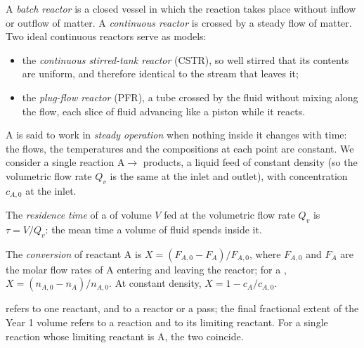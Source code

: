 \begin{definition}\label{def:b2:continuous-reactors:reactors}
A \emph{batch reactor} is a closed vessel in which the
reaction takes place without inflow or outflow of matter. A
\emph{continuous reactor} is crossed by a steady
flow of matter. Two ideal continuous reactors serve as models:
\begin{itemize}
  \item the \emph{continuous stirred-tank reactor} (CSTR), so well stirred that its contents are
        uniform, and therefore identical to the stream that leaves it;
  \item the \emph{plug-flow reactor} (PFR), a tube
        crossed by the fluid without mixing along the flow, each slice of
        fluid advancing like a piston while it reacts.
\end{itemize}
\end{definition}

A  is said to work in \emph{steady operation} when
nothing inside it changes with time: the flows, the temperatures and the
compositions at each point are constant. We consider a single reaction
$\mathrm A \to$ products, a liquid feed of constant density (so the
volumetric flow rate $Q_v$ is the same at the inlet and outlet), with
concentration $c_{A,0}$ at the inlet.

\begin{definition}\label{def:b2:continuous-reactors:residence-time}
The \emph{residence time} of a  of
volume $V$ fed at the volumetric flow rate $Q_v$ is $\tau = V/Q_v$: the mean
time a volume of fluid spends inside it.
\end{definition}

\begin{definition}[Conversion]\label{def:b2:continuous-reactors:conversion}
The \emph{conversion} of reactant A is $X = (F_{A,0} -
F_A)/F_{A,0}$, where $F_{A,0}$ and $F_A$ are the molar flow rates of A
entering and leaving the reactor; for a , $X = (n_{A,0} -
n_A)/n_{A,0}$. At constant density, $X = 1 - c_A/c_{A,0}$.
\end{definition}

 refers to one reactant, and to a reactor or a pass; the final
fractional extent of the Year 1 volume refers to a reaction and to its
limiting reactant. For a single reaction whose limiting reactant is A, the
two coincide.

